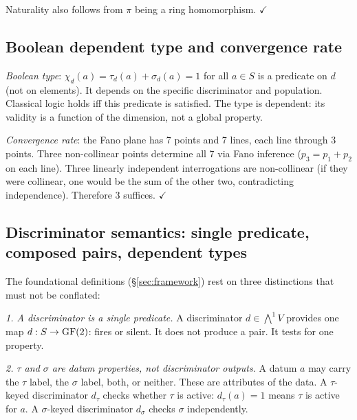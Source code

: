 Naturality also follows from $\pi$ being
a ring homomorphism. $\checkmark$

\subsection{Boolean dependent type and convergence rate}
\label{app:bool-convergence}

\emph{Boolean type}: $\chi_d(a) = \tau_d(a) + \sigma_d(a)
= 1$ for all $a \in S$ is a predicate on $d$ (not on
elements). It depends on the specific discriminator and
population. Classical logic holds iff this predicate is
satisfied. The type is dependent: its validity is a
function of the dimension, not a global property.

\emph{Convergence rate}: the Fano plane has 7 points and 7
lines, each line through 3 points. Three non-collinear
points determine all 7 via Fano inference ($p_3 = p_1 +
p_2$ on each line). Three linearly independent
interrogations are non-collinear (if they were collinear,
one would be the sum of the other two, contradicting
independence). Therefore 3 suffices. $\checkmark$

\subsection{Discriminator semantics: single predicate,
  composed pairs, dependent types}
\label{app:discriminator-semantics}

The foundational definitions (\S\ref{sec:framework})
rest on three distinctions that must not be conflated:

\emph{1. A discriminator is a single predicate.}
A discriminator $d \in \bigwedge^1 V$ provides one map
$d: S \to \operatorname{GF}(2)$: fires or silent. It does not produce
a pair. It tests for one property.

\emph{2. $\tau$ and $\sigma$ are datum properties, not
discriminator outputs.}
A datum $a$ may carry the $\tau$ label, the $\sigma$
label, both, or neither. These are attributes of the
data. A $\tau$-keyed discriminator $d_\tau$ checks
whether $\tau$ is active: $d_\tau(a) = 1$ means $\tau$
is active for $a$. A $\sigma$-keyed discriminator
$d_\sigma$ checks $\sigma$ independently.

